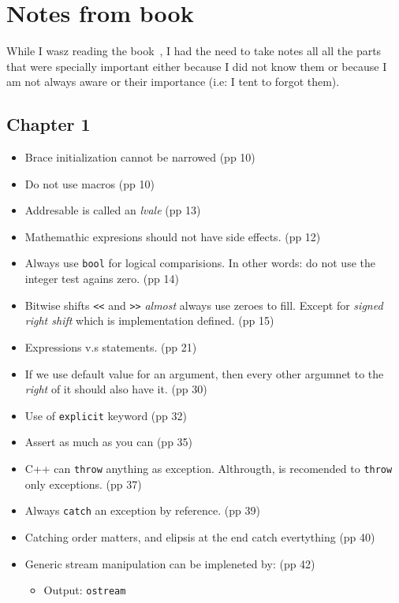 \section{Notes from book}

While I wasz reading the book~\cite{Gottschling2015}, I had the need to take notes all all the parts that were specially important either because I did not know them or because I am not always aware or their importance (i.e: I tent to forgot them).

\subsection{Chapter 1}
\begin{itemize}
 \item Brace initialization cannot be narrowed (pp 10)
 \item Do not use macros (pp 10)
 \item Addresable is called an \emph{lvale} (pp 13)
 \item Mathemathic expresions should not have side effects. (pp 12)
 \item Always use \texttt{bool} for logical comparisions. In other words: do not use the integer test agains zero. (pp 14)
 \item Bitwise shifts \texttt{<<} and \texttt{>>} \emph{almost} always use zeroes to fill. Except for \emph{signed right shift} which is implementation defined. (pp 15)
 \item Expressions v.s statements. (pp 21)
 \item If we use default value for an argument, then every other argumnet to the \emph{right} of it should also have it. (pp 30)
 \item Use of \texttt{explicit} keyword (pp 32)
 \item Assert as much as you can (pp 35)
 \item C++ can \texttt{throw} anything as exception. Althrougth, is recomended to \texttt{throw} only exceptions. (pp 37)
 \item Always \texttt{catch} an exception by reference. (pp 39)
 \item Catching order matters, and elipsis at the end catch evertything (pp 40)
 \item Generic stream manipulation can be impleneted by: (pp 42)
 \begin{itemize}
  \item Output: \texttt{ostream}

\end{itemize}
\end{itemize}

